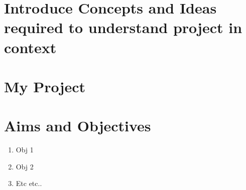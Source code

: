 \section{Introduce Concepts and Ideas required to understand project in context}
\lipsum %
\section{My Project}
\lipsum %
\section{Aims and Objectives}
\begin{enumerate}
    \item Obj 1
    \item Obj 2
    \item Etc etc..
\end{enumerate}